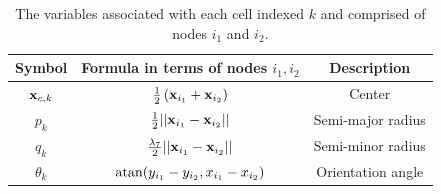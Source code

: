 \begin{table}[!htb]
\begin{center}
    \begin{tabular}{ |c|c|c| } 
     \hline
      \textbf{Symbol} & \textbf{Formula in terms of nodes $i_1, i_2$} & \textbf{Description} \\ 
      \hline
     $\vb{x}_{c,k}$ & $\frac{1}{2} \left(\vb{x}_{i_1} + \vb{x}_{i_2}\right)$     & Center \\ 
     $p_k$          & $\frac{1}{2}||\vb{x}_{i_1} - \vb{x}_{i_2}||$                     & Semi-major radius \\ 
     $q_k$          & $\frac{\lambda_7}{2}||\vb{x}_{i_1} - \vb{x}_{i_2}||$                                      & Semi-minor radius \\         
     $\theta_k$     & $\atan (y_{i_1} - y_{i_2},x_{i_1} - x_{i_2} )$                   & Orientation angle \\         
     \hline   
    \end{tabular}   
\end{center}
\caption{The variables associated with each cell indexed $k$ and comprised of 
         nodes $i_1$ and $i_2$.}
\label{table:perCellVariables}
\end{table}

